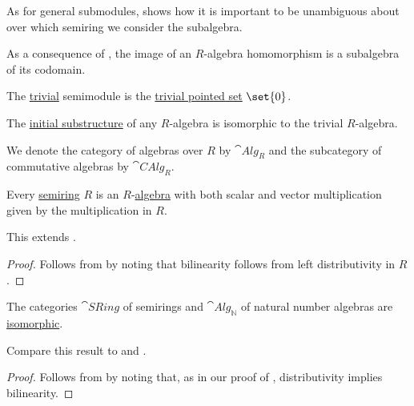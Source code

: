 \begin{definition}
\begin{thmenum}
    As for general submodules,  shows how it is important to be unambiguous about over which semiring we consider the subalgebra.

    As a consequence of , the image of an \( R \)-algebra homomorphism is a subalgebra of its codomain.

     The \hyperref[rem:trivial_structure]{trivial} semimodule is the \hyperref[rem:pointed_set/trivial]{trivial pointed set} \( \set{ 0 } \).

     The \hyperref[thm:substructures_form_complete_lattice/bottom]{initial substructure} of any \( R \)-algebra is isomorphic to the trivial \( R \)-algebra.

     We denote the category of algebras over \( R \) by \( \cat{Alg}_R \) and the subcategory of commutative algebras by \( \cat{CAlg}_R \).
  \end{thmenum}
\end{definition}

\begin{proposition}\label{thm:semiring_is_algebra}
  Every \hyperref[def:semiring]{semiring} \( R \) is an \( R \)-\hyperref[def:algebra_over_semiring]{algebra} with both scalar and vector multiplication given by the multiplication in \( R \).

  This extends .
\end{proposition}
\begin{proof}
  Follows from  by noting that bilinearity follows from left distributivity in \( R \).
\end{proof}

\begin{proposition}\label{thm:semiring_is_natural_number_algebra}
  The categories \( \hyperref[def:semiring/category]{\cat{SRing}} \) of semirings and \( \hyperref[def:algebra_over_semiring/category]{\cat{Alg}_\BbbN} \) of natural number algebras are \hyperref[rem:category_similarity/isomorphism]{isomorphic}.

  Compare this result to  and .
\end{proposition}
\begin{proof}
  Follows from  by noting that, as in our proof of , distributivity implies bilinearity.
\end{proof}

